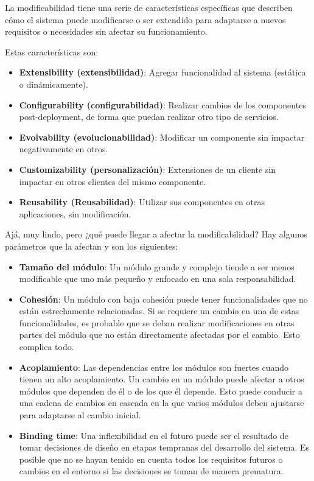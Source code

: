 \documentclass{article}
\begin{document}
		La modificabilidad tiene una serie de características específicas que describen cómo el sistema puede modificarse o ser extendido para adaptarse a nuevos requisitos o necesidades sin afectar su funcionamiento.
		
		Estas características son:
		\begin{itemize}		
			\item \textbf{Extensibility (extensibilidad)}: Agregar funcionalidad al sistema (estática o
			dinámicamente).
			
			\item \textbf{Configurability (configurabilidad)}: Realizar cambios de los componentes post-deployment, de forma que puedan realizar otro tipo de servicios.
			
			\item \textbf{Evolvability (evolucionabilidad)}: Modificar un componente sin impactar negativamente
			en otros.
			
			
			\item \textbf{Customizability (personalización)}: Extensiones de un cliente sin impactar en otros clientes del mismo componente.
			
			\item \textbf{Reusability (Reusabilidad)}: Utilizar sus componentes en otras aplicaciones, sin
			modificación.
			
		\end{itemize}
		
		Ajá, muy lindo, pero ¿qué puede llegar a afectar la modificabilidad? Hay algunos parámetros que la afectan y son los siguientes:
		\begin{itemize}		
			\item \textbf{Tamaño del módulo}: Un módulo grande y complejo tiende a ser menos modificable que uno más pequeño y enfocado en una sola responsabilidad.
			
			\item \textbf{Cohesión}: Un módulo con baja cohesión puede tener funcionalidades que no están estrechamente relacionadas. Si se requiere un cambio en una de estas funcionalidades, es probable que se deban realizar modificaciones en otras partes del módulo que no están directamente afectadas por el cambio. Esto complica todo.
			
			\item \textbf{Acoplamiento}: Las dependencias entre los módulos son fuertes cuando tienen un alto acoplamiento. Un cambio en un módulo puede afectar a otros módulos que dependen de él o de los que él depende. Esto puede conducir a una cadena de cambios en cascada en la que varios módulos deben ajustarse para adaptarse al cambio inicial.
			
			
			\item \textbf{Binding time}: Una inflexibilidad en el futuro puede ser el resultado de tomar decisiones de diseño en etapas tempranas del desarrollo del sistema. Es posible que no se hayan tenido en cuenta todos los requisitos futuros o cambios en el entorno si las decisiones se toman de manera prematura.
			
		\end{itemize}
\end{document}
